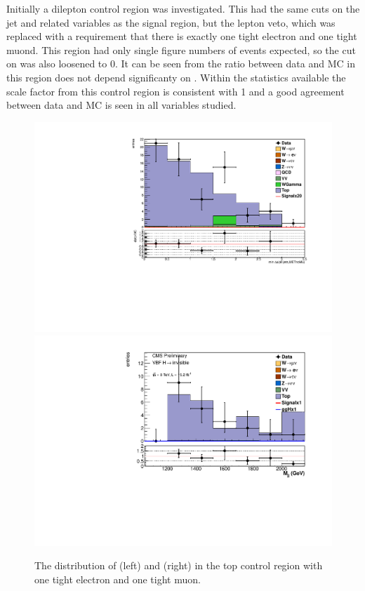 Initially a dilepton control region was investigated. This had the same cuts on the jet and \MET related variables as the signal region, but the lepton veto, which was replaced with a requirement that there is exactly one tight electron and one tight muond. This region had only single figure numbers of events expected, so the cut on \jetmetdphi was also loosened to 0. It can be seen from  the ratio between data and MC in this region does not depend significanty on \jetmetdphi. Within the statistics available the scale factor from this control region is consistent with 1 and a good agreement between data and \ac{MC} is seen in all variables studied.

\begin{figure}
  \includegraphics[width=.6\largefigwidth]{plots/parked/topjetmetdphicut0.pdf}
  \includegraphics[width=.6\largefigwidth]{plots/parked/AN-14-243-figs/output_sigreg/top_dijet_M.pdf}
  \caption{The distribution of \jetmetdphi (left) and \Mjj (right) in the top control region with one tight electron and one tight muon.}
  \label{fig:parkedtopjetmetdphi}
\end{figure}

